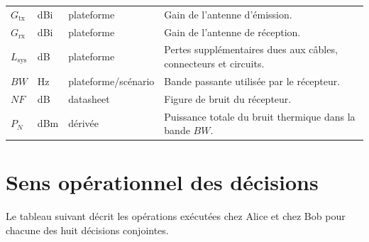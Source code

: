 \documentclass[conference,a4paper]{IEEEtran}
\begin{document}
\begin{table}[H]
\begin{tabular}{p{1.7cm} p{1.8cm} p{3.0cm} p{8.0cm}}
$G_{\mathrm{tx}}$
& dBi & plateforme
& Gain de l'antenne d'émission. \\

$G_{\mathrm{rx}}$
& dBi & plateforme
& Gain de l'antenne de réception. \\

$L_{\mathrm{sys}}$
& dB & plateforme
& Pertes supplémentaires dues aux câbles, connecteurs et circuits. \\

$BW$
& Hz & plateforme/scénario
& Bande passante utilisée par le récepteur. \\

$NF$
& dB & datasheet
& Figure de bruit du récepteur. \\

$P_N$
& dBm & dérivée
& Puissance totale du bruit thermique dans la bande $BW$. \\

\hline
\end{tabular}
\end{table}

\section{Sens opérationnel des décisions}
\label{ann:decisions}
Le tableau suivant décrit les opérations exécutées chez Alice et chez Bob pour chacune des huit décisions conjointes.
\end{document}
